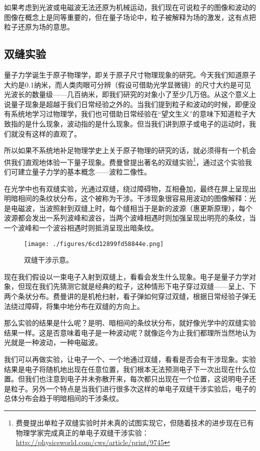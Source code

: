 如果考虑到光波或电磁波无法还原为机械运动，我们现在可说粒子的图像和波动的图像在概念上是同等重要的，但在量子场论中，粒子被解释为场的激发，这有点把粒子还原为场的意思。

\subsection{双缝实验}

量子力学诞生于原子物理学，即关于原子尺寸物理现象的研究。今天我们知道原子大约是0.1纳米，而人类肉眼可分辨（假设可借助光学显微镜）的尺寸大约是可见光波长的数量级——几百纳米，即我们研究的对象小了至少几万倍。从这个意义上说量子现象是超越于我们日常经验之外的。当我们提到粒子和波动的时候，即便没有系统地学习过物理学，我们也可借助日常经验在“望文生义”的意味下知道粒子大致指的是什么现象，波动指的是什么现象。但当我们讲到原子或电子的运动时，我们就没有这样的直观了。

所以如果不系统地补足物理学史上关于原子物理的研究的话，就必须得有一个机会供我们直观地体验一下量子现象。费曼曾提出著名的双缝实验\footnote{费曼提出单粒子双缝实验时并未真的试图实现它，但随着技术的进步现在已有物理学家完成真正的单电子双缝干涉实验：\url{http://physicsworld.com/cws/article/print/9745}}，通过这个实验我们可建立量子力学的基本概念——波粒二像性。

在光学中也有双缝实验，光通过双缝，绕过障碍物，互相叠加，最终在屏上呈现出明暗相间的条纹状分布，这个被称为干涉。干涉现象很容易用波动的图像解释：光是电磁波，当波照射到双缝上时，每个缝相当于是新的波源（惠更斯原理），每个波源都会发出一系列波峰和波谷，当两个波峰相遇时则加强呈现出明亮的条纹，当一个波峰和一个波谷相遇时则抵消呈现出暗条纹。

\begin{figure}[ht]
\centering
\texttt{[image: ./figures/6cd12899fd58844e.png]}
\caption{双缝⼲涉示意。} \label{fig_QMPre7_1}
\end{figure}

现在我们假设以一束电子入射到双缝上，看看会发生什么现象。电子是量子力学对象，但现在我们先猜测它就是经典的粒子，这种情形下电子穿过双缝——呈上、下两个条状分布。费曼讲的是机枪扫射，看子弹如何穿过双缝，根据日常经验子弹无法绕过障碍，将集中地分布在双缝的方向上。

那么实验的结果是什么呢？是明、暗相间的条纹状分布，就好像光学中的双缝实验结果一样。这是否意味着电子是一种波动呢？就像迄今为止我们都理所当然地认为光就是一种波动，一种电磁波。

我们可以再做实验，让电子一个、一个地通过双缝，看看是否会有干涉现象。实验结果是电子将随机地出现在任意位置，我们根本无法预测电子下一次出现在什么位置。但我们也注意到电子并未弥散开来，每次都只出现在一个位置，这说明电子还是粒子。另外一个特点是当我们进行很多次这样的单电子双缝干涉实验后，电子的总体分布会趋于明暗相间的干涉条纹。

